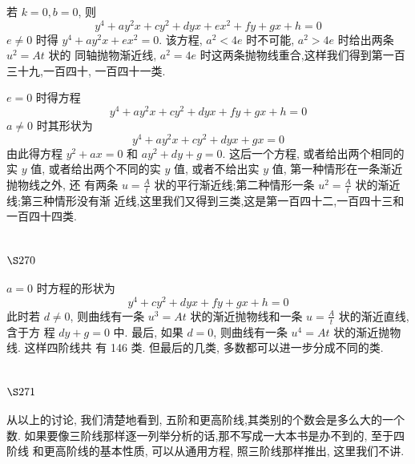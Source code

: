 若 $k=0, b=0$, 则
\[
y^{4}+a y^{2} x+c y^{2}+d y x+e x^{2}+f y+g x+h=0
\]
$e \neq 0$ 时得 $y^{4}+a y^{2} x+e x^{2}=0$. 该方程, $a^{2}<4 e$ 时不可能, $a^{2}>4 e$ 时给出两条 $u^{2}=A t$ 状的 同轴抛物渐近线, $a^{2}=4 e$ 时这两条抛物线重合,这样我们得到第一百三十九,一百四十, 一百四十一类.

$e=0$ 时得方程
\[
y^{4}+a y^{2} x+c y^{2}+d y x+f y+g x+h=0
\]
$a \neq 0$ 时其形状为
\[
y^{4}+a y^{2} x+c y^{2}+d y x+g x=0
\]
由此得方程 $y^{2}+a x=0$ 和 $a y^{2}+d y+g=0$. 这后一个方程, 或者给出两个相同的实 $y$ 值, 或者给出两个不同的实 $y$ 值, 或者不给出实 $y$ 值, 第一种情形在一条渐近抛物线之外, 还 有两条 $u=\frac{A}{t}$ 状的平行渐近线;第二种情形一条 $u^{2}=\frac{A}{t}$ 状的渐近线;第三种情形没有渐 近线,这里我们又得到三类,这是第一百四十二,一百四十三和一百四十四类.

\section{$\S 270$}

$a=0$ 时方程的形状为
\[
y^{4}+c y^{2}+d y x+f y+g x+h=0
\]
此时若 $d \neq 0$, 则曲线有一条 $u^{3}=A t$ 状的渐近抛物线和一条 $u=\frac{A}{t}$ 状的渐近直线,含于方 程 $d y+g=0$ 中. 最后, 如果 $d=0$, 则曲线有一条 $u^{4}=A t$ 状的渐近抛物线. 这样四阶线共 有 146 类. 但最后的几类, 多数都可以进一步分成不同的类.

\section{$\S 271$}

从以上的讨论, 我们清楚地看到, 五阶和更高阶线,其类别的个数会是多么大的一个 数. 如果要像三阶线那样逐一列举分析的话,那不写成一大本书是办不到的, 至于四阶线 和更高阶线的基本性质, 可以从通用方程, 照三阶线那样推出, 这里我们不讲. 

